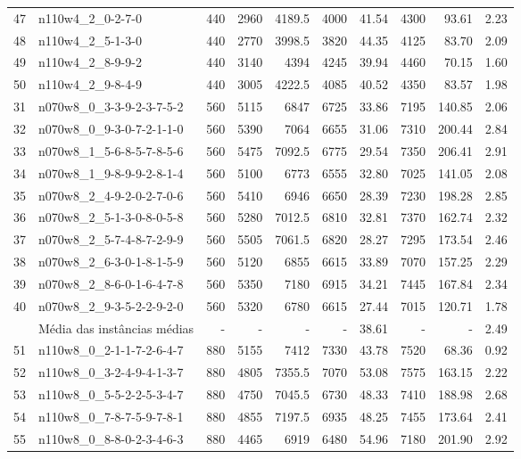 \documentclass[cic,tc, twoside]{iiufrgs}
\begin{document}
\begin{table}[!]
{\begin{tabular}{rlrrrrrrrr}
47	&	n110w4\_2\_0-2-7-0			&	440	&	2960	&	4189.5	&	4000	&	41.54	&	4300	&	93.61	&	2.23	\\
48	&	n110w4\_2\_5-1-3-0			&	440	&	2770	&	3998.5	&	3820	&	44.35	&	4125	&	83.70	&	2.09	\\
49	&	n110w4\_2\_8-9-9-2			&	440	&	3140	&	4394	&	4245	&	39.94	&	4460	&	70.15	&	1.60	\\
50	&	n110w4\_2\_9-8-4-9			&	440	&	3005	&	4222.5	&	4085	&	40.52	&	4350	&	83.57	&	1.98	\\
31	&	n070w8\_0\_3-3-9-2-3-7-5-2	&	560	&	5115	&	6847	&	6725	&	33.86	&	7195	&	140.85	&	2.06	\\
32	&	n070w8\_0\_9-3-0-7-2-1-1-0	&	560	&	5390	&	7064	&	6655	&	31.06	&	7310	&	200.44	&	2.84	\\
33	&	n070w8\_1\_5-6-8-5-7-8-5-6	&	560	&	5475	&	7092.5	&	6775	&	29.54	&	7350	&	206.41	&	2.91	\\
34	&	n070w8\_1\_9-8-9-9-2-8-1-4	&	560	&	5100	&	6773	&	6555	&	32.80	&	7025	&	141.05	&	2.08	\\
35	&	n070w8\_2\_4-9-2-0-2-7-0-6	&	560	&	5410	&	6946	&	6650	&	28.39	&	7230	&	198.28	&	2.85	\\
36	&	n070w8\_2\_5-1-3-0-8-0-5-8	&	560	&	5280	&	7012.5	&	6810	&	32.81	&	7370	&	162.74	&	2.32	\\
37	&	n070w8\_2\_5-7-4-8-7-2-9-9	&	560	&	5505	&	7061.5	&	6820	&	28.27	&	7295	&	173.54	&	2.46	\\
38	&	n070w8\_2\_6-3-0-1-8-1-5-9	&	560	&	5120	&	6855	&	6615	&	33.89	&	7070	&	157.25	&	2.29	\\
39	&	n070w8\_2\_8-6-0-1-6-4-7-8	&	560	&	5350	&	7180	&	6915	&	34.21	&	7445	&	167.84	&	2.34	\\
40	&	n070w8\_2\_9-3-5-2-2-9-2-0	&	560	&	5320	&	6780	&	6615	&	27.44	&	7015	&	120.71	&	1.78	\\
 \midrule		
    &   Média das instâncias médias	&    -  &   -       &   -       &   -       &	38.61   &   -       &   -       &   2.49  \\		
  \midrule	
51	&	n110w8\_0\_2-1-1-7-2-6-4-7	&	880	&	5155	&	7412	&	7330	&	43.78	&	7520	&	68.36	&	0.92	\\
52	&	n110w8\_0\_3-2-4-9-4-1-3-7	&	880	&	4805	&	7355.5	&	7070	&	53.08	&	7575	&	163.15	&	2.22	\\
53	&	n110w8\_0\_5-5-2-2-5-3-4-7	&	880	&	4750	&	7045.5	&	6730	&	48.33	&	7410	&	188.98	&	2.68	\\
54	&	n110w8\_0\_7-8-7-5-9-7-8-1	&	880	&	4855	&	7197.5	&	6935	&	48.25	&	7455	&	173.64	&	2.41	\\
55	&	n110w8\_0\_8-8-0-2-3-4-6-3	&	880	&	4465	&	6919	&	6480	&	54.96	&	7180	&	201.90	&	2.92	\\

\end{tabular}}
\end{table}
\end{document}
